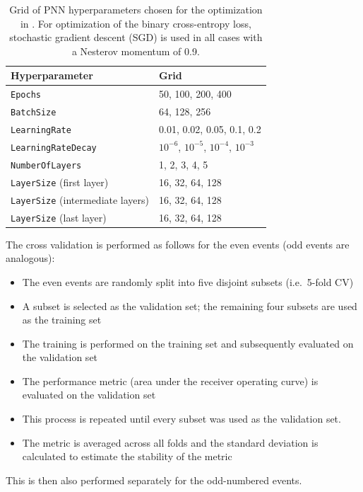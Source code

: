 \begin{table}
  \centering
  \begin{tabular}{ll}
    \toprule
    Hyperparameter & Grid \\
    \midrule
    \texttt{Epochs} & 50, 100, 200, 400 \\
    \texttt{BatchSize} & 64, 128, 256 \\
    \texttt{LearningRate} & 0.01, 0.02, 0.05, 0.1, 0.2 \\
    \texttt{LearningRateDecay} & $10^{-6}$, $10^{-5}$, $10^{-4}$, $10^{-3}$ \\
    \texttt{NumberOfLayers} & 1, 2, 3, 4, 5 \\
    \texttt{LayerSize} (first layer) & 16, 32, 64, 128 \\
    \texttt{LayerSize} (intermediate layers) & 16, 32, 64, 128 \\
    \texttt{LayerSize} (last layer) & 16, 32, 64, 128 \\
    \bottomrule
  \end{tabular}
  \caption{Grid of PNN hyperparameters chosen for the optimization in
    \hadhad. For optimization of the binary cross-entropy loss,
    stochastic gradient descent (SGD) is used in all cases with a
    Nesterov momentum of 0.9.}
  \label{tab:hadhad_mva_pnn_param_grid}
\end{table}


The cross validation is performed as follows for the even events (odd
events are analogous):
\begin{itemize}
\item The even events are randomly split into five disjoint subsets
  (i.e.\ 5-fold CV)
\item A subset is selected as the validation set; the remaining four
  subsets are used as the training set
\item The training is performed on the training set and subsequently
  evaluated on the validation set
\item The performance metric (area under the receiver operating curve)
  is evaluated on the validation set
\item This process is repeated until every subset was used as the
  validation set.
\item The metric is averaged across all folds and the standard
  deviation is calculated to estimate the stability of the metric
\end{itemize}
This is then also performed separately for the odd-numbered events.

